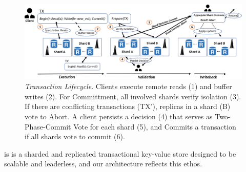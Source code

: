 
\begin{figure}[!th]
\begin{center}
\includegraphics[width= \textwidth]{./figures/Archi.png}
\end{center}
\caption{{\em Transaction Lifecycle}. Clients execute remote reads (1) and buffer writes (2). For Committment, all involved shards verify isolation (3). If there are conflicting transactions (TX'), replicas in a shard (B) vote to Abort. A client persists a decision (4) that serves as Two-Phase-Commit Vote for each shard (5), and Commits a transaction if all shards vote to commit (6).}
\label{fig:Figure1}
\end{figure}
 

\sys is is a sharded and replicated transactional key-value store designed to be scalable and leaderless, and our architecture reflects this ethos. \sys{} 

